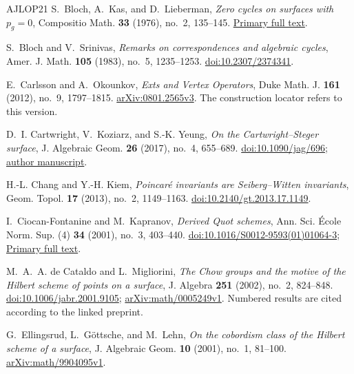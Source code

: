 \begin{thebibliography}{AJLOP21}
S.~Bloch, A.~Kas, and D.~Lieberman,
\emph{Zero cycles on surfaces with $p_g=0$},
Compositio Math. \textbf{33} (1976), no.~2, 135--145.
\href{https://www.numdam.org/item/CM_1976__33_2_135_0.pdf}{Primary full text}.

S.~Bloch and V.~Srinivas,
\emph{Remarks on correspondences and algebraic cycles},
Amer. J. Math. \textbf{105} (1983), no.~5, 1235--1253.
\href{https://doi.org/10.2307/2374341}{doi:10.2307/2374341}.

E.~Carlsson and A.~Okounkov,
\emph{Exts and Vertex Operators},
Duke Math. J. \textbf{161} (2012), no.~9, 1797--1815.
\href{https://arxiv.org/abs/0801.2565v3}{arXiv:0801.2565v3}.
The construction locator refers to this version.

D.~I. Cartwright, V.~Koziarz, and S.-K. Yeung,
\emph{On the Cartwright--Steger surface},
J. Algebraic Geom. \textbf{26} (2017), no.~4, 655--689.
\href{https://doi.org/10.1090/jag/696}{doi:10.1090/jag/696};
\href{https://www.maths.usyd.edu.au/u/donaldc/cs-surface/cs-surface.pdf}{author manuscript}.

H.-L. Chang and Y.-H. Kiem,
\emph{Poincar\'e invariants are Seiberg--Witten invariants},
Geom. Topol. \textbf{17} (2013), no.~2, 1149--1163.
\href{https://doi.org/10.2140/gt.2013.17.1149}{doi:10.2140/gt.2013.17.1149}.

I.~Ciocan-Fontanine and M.~Kapranov,
\emph{Derived Quot schemes},
Ann. Sci. \'Ecole Norm. Sup. (4) \textbf{34} (2001), no.~3, 403--440.
\href{https://doi.org/10.1016/S0012-9593(01)01064-3}{doi:10.1016/S0012-9593(01)01064-3};
\href{https://www.numdam.org/item/ASENS_2001_4_34_3_403_0.pdf}{Primary full text}.

M.~A.~A. de Cataldo and L.~Migliorini,
\emph{The Chow groups and the motive of the Hilbert scheme of points on a surface},
J. Algebra \textbf{251} (2002), no.~2, 824--848.
\href{https://doi.org/10.1006/jabr.2001.9105}{doi:10.1006/jabr.2001.9105};
\href{https://arxiv.org/abs/math/0005249v1}{arXiv:math/0005249v1}.
Numbered results are cited according to the linked preprint.

G.~Ellingsrud, L.~G\"ottsche, and M.~Lehn,
\emph{On the cobordism class of the Hilbert scheme of a surface},
J. Algebraic Geom. \textbf{10} (2001), no.~1, 81--100.
\href{https://arxiv.org/abs/math/9904095v1}{arXiv:math/9904095v1}.


\end{thebibliography}
